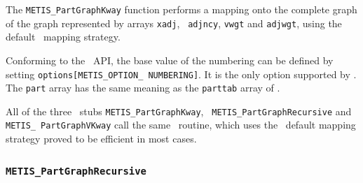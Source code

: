 \begin{itemize}
\progdes

The {\tt METIS\_PartGraphKway} function performs a mapping onto the
complete graph of the graph represented by arrays {\tt xadj}, {\tt
adjncy}, {\tt vwgt} and {\tt adjwgt}, using the default
\scotch\ mapping strategy.

Conforming to the \metis\ API, the base value of the numbering
can be defined by setting \texttt{options[METIS\_\lbt OPTION\_\lbt
NUMBERING]}. It is the only option supported by \scotch.
The {\tt part} array has the same meaning as the {\tt parttab} array
of \scotch.

All of the three \metis\ stubs
{\tt METIS\_\lbo Part\lbo Graph\lbo Kway}, {\tt
METIS\_\lbo Part\lbo Graph\lbo Recursive} and {\tt METIS\_\lbo
Part\lbo Graph\lbo VKway} call the same \scotch\ routine, which uses
the \scotch\ default mapping strategy proved to be efficient in most
cases.
\end{itemize}

\subsubsection{{\tt METIS\_PartGraphRecursive}}

